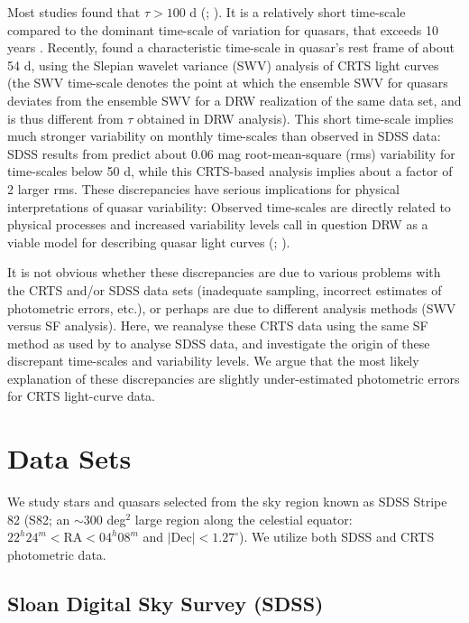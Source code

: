 \documentclass[fleqn,usenatbib]{mnras}
\begin{document}
Most studies found that $\tau > 100$ d (\citealt{macleod2010};  \citealt{kozlowski2016}). It is a relatively short time-scale compared to the dominant time-scale of variation for quasars, that exceeds 10 years \citep{hawkins2007}. Recently, \cite{graham2014} 
found a characteristic time-scale in quasar's rest frame of about 54 d, using the Slepian wavelet variance (SWV) analysis
of CRTS light curves (the SWV time-scale denotes the point at which the ensemble SWV for quasars deviates from
the ensemble SWV for a DRW  realization of the same data set, and is thus different from $\tau$ obtained in DRW analysis). 
This short time-scale implies much stronger variability on monthly time-scales than observed in SDSS 
data: SDSS results from \cite{macleod2010} predict about 0.06 mag root-mean-square (rms) variability for time-scales below 
50 d, while this CRTS-based analysis implies about a factor of 2 larger rms. These discrepancies have serious
implications for physical interpretations of quasar variability: Observed time-scales are directly related to physical processes
and increased variability levels call in question DRW as a viable model for describing quasar light curves 
(\citealt{macleod2010};  \citealt{kozlowski2016}). 

It is not obvious whether these discrepancies are due to various problems with the CRTS and/or SDSS data sets
(inadequate sampling, incorrect estimates of photometric errors, etc.), or perhaps are due to different analysis 
methods (SWV versus SF analysis). Here, we reanalyse these CRTS data using the same SF method as used by
\cite{macleod2010} to analyse SDSS data, and investigate the origin of these discrepant time-scales and 
variability levels. We argue that the most likely explanation of these discrepancies are slightly under-estimated
photometric errors for CRTS light-curve data. 


\section{Data Sets}

We study stars and quasars selected from the sky region known as SDSS Stripe 82 (S82; an $\sim$300 deg$^2$ large
region along the celestial equator: $22^{h} 24^{m} < \mathrm{RA} < 04^{h} 08^{m}$ and $\mathrm{| Dec |} < 1.27^\circ$). 
We utilize both SDSS and CRTS photometric data. 

\subsection{Sloan Digital Sky Survey (SDSS)}
\end{document}
